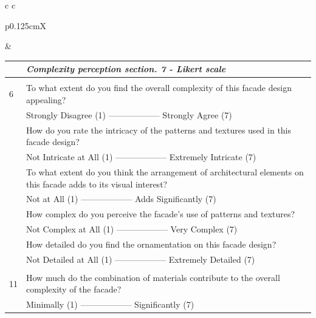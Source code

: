 \documentclass[final,5p,times]{elsarticle}
\begin{document}
\begin{table}[!htb]
\begin{tabular}{c c}
\begin{minipage}{.48\linewidth}
\begin{tabularx}{\linewidth}{p{0.125cm}X}
        \end{tabularx}
        \end{minipage}
        &
        \begin{minipage}{.48\linewidth}
            \centering
            \label{tab:ComplexitySurvey}
            \small
            \begin{tabularx}{\linewidth}{p{0.125cm}X}
                    \toprule
                    & \textit{Complexity perception section. 7 - Likert scale} \\
                    \midrule
                    \\
                    6 & To what extent do you find the overall complexity of this facade design appealing?\\
                    & Strongly Disagree (1) —————— Strongly Agree (7) \\
                    \addlinespace
                    7 & How do you rate the intricacy of the patterns and textures used in this facade design? \\
                    & Not Intricate at All (1) —————— Extremely Intricate (7)\\
                    \addlinespace
                    8 & To what extent do you think the arrangement of architectural elements on this facade adds to its visual interest? \\
                    & Not at All (1) —————— Adds Significantly (7) \\
                    \addlinespace
                    9 & How complex do you perceive the facade's use of patterns and textures? \\
                    & Not Complex at All (1) —————— Very Complex (7) \\
                    \addlinespace
                    10 & How detailed do you find the ornamentation on this facade design? \\
                    & Not Detailed at All (1) —————— Extremely Detailed (7) \\
                    \addlinespace
                    \\
                    11 & How much do the combination of materials contribute to the overall complexity of the facade? \\
                    & Minimally (1) —————— Significantly (7) \\

\end{tabularx}
\end{minipage}
\end{tabular}
\end{table}
\end{document}
